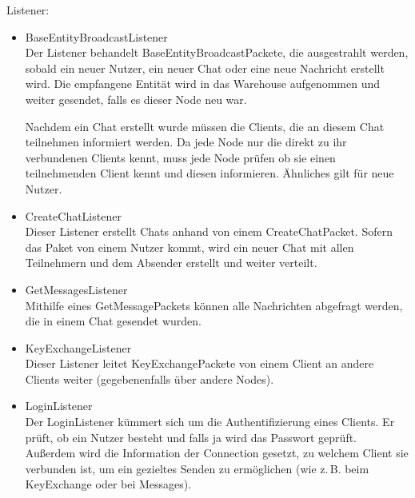 Listener:
\begin{itemize}
    \item BaseEntityBroadcastListener\\
        Der Listener behandelt BaseEntityBroadcastPackete, die ausgestrahlt werden, sobald ein neuer Nutzer, ein neuer Chat oder eine neue Nachricht erstellt wird. Die empfangene Entität wird in das Warehouse aufgenommen und weiter gesendet, falls es dieser Node neu war.
        
        Nachdem ein Chat erstellt wurde müssen die Clients, die an diesem Chat teilnehmen informiert werden. Da jede Node nur die direkt zu ihr verbundenen Clients kennt, muss jede Node prüfen ob sie einen teilnehmenden Client kennt und diesen informieren. Ähnliches gilt für neue Nutzer.
        
    \item CreateChatListener\\
        Dieser Listener erstellt Chats anhand von einem CreateChatPacket. Sofern das Paket von einem Nutzer kommt, wird ein neuer Chat mit allen Teilnehmern und dem Absender erstellt und weiter verteilt.
        
    \item GetMessagesListener\\
        Mithilfe eines GetMessagePackets können alle Nachrichten abgefragt werden, die in einem Chat gesendet wurden.
        
    \item KeyExchangeListener\\
        Dieser Listener leitet KeyExchangePackete von einem Client an andere Clients weiter (gegebenenfalls über andere Nodes).
        
    \item LoginListener\\
        Der LoginListener kümmert sich um die Authentifizierung eines Clients. Er prüft, ob ein Nutzer besteht und falls ja wird das Passwort geprüft.
        Außerdem wird die Information der Connection gesetzt, zu welchem Client sie verbunden ist, um ein gezieltes Senden zu ermöglichen (wie z.\,B. beim KeyExchange oder bei Messages).

\end{itemize}

